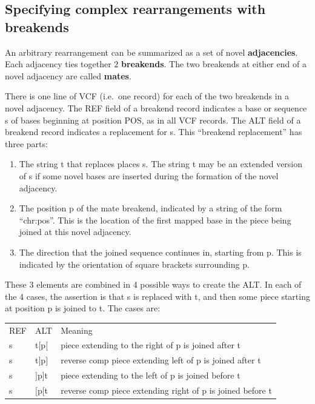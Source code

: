 \documentclass[8pt]{article}
\begin{document}
\subsection{Specifying complex rearrangements with breakends}
\label{Breakends}

An arbitrary rearrangement can be summarized as a set of novel \textbf{adjacencies}. Each adjacency ties together $2$ \textbf{breakends}.
The two breakends at either end of a novel adjacency are called \textbf{mates}.

There is one line of VCF (i.e.\ one record) for each of the two breakends in a novel adjacency.
The REF field of a breakend record indicates a base or sequence s of bases beginning at position POS, as in all VCF records.
The ALT field of a breakend record indicates a replacement for s.
This ``breakend replacement'' has three parts:
\begin{enumerate}
  \item The string t that replaces places s.
  The string t may be an extended version of s if some novel bases are inserted during the formation of the novel adjacency.
  \item The position p of the mate breakend, indicated by a string of the form ``chr:pos''.
  This is the location of the first mapped base in the piece being joined at this novel adjacency.
  \item The direction that the joined sequence continues in, starting from p.
  This is indicated by the orientation of square brackets surrounding p.

\end{enumerate}
These 3 elements are combined in 4 possible ways to create the ALT.
In each of the 4 cases, the assertion is that s is replaced with t, and then some piece starting at position p is joined to t.
The cases are:

\vspace{0.3cm}
\begin{tabular}{ l l l }
REF & ALT & Meaning \\
s & t$[$p$[$ & piece extending to the right of p is joined after t \\
s & t$]$p$]$ & reverse comp piece extending left of p is joined after t \\
s & $]$p$]$t & piece extending to the left of p is joined before t \\
s & $[$p$[$t & reverse comp piece extending right of p is joined before t \\
\end{tabular}
\vspace{0.3cm}
\end{document}
